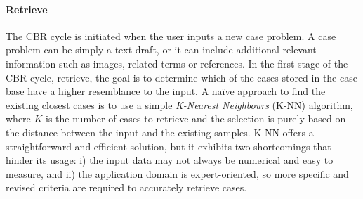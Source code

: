 \paragraph{Retrieve}\label{5_sec:dl_powered_cbr_retrieve}
The CBR cycle is initiated when the user inputs a new case problem. A case problem can be simply a text draft, or it can include additional relevant information such as images, related terms or references. In the first stage of the CBR cycle, retrieve, the goal is to determine which of the cases stored in the case base have a higher resemblance to the input. A naïve approach to find the existing closest cases is to use a simple \textit{K-Nearest Neighbours} (K-NN) algorithm, where $K$ is the number of cases to retrieve and the selection is purely based on the distance between the input and the existing samples. K-NN offers a straightforward and efficient solution, but it exhibits two shortcomings that hinder its usage: i) the input data may not always be numerical and easy to measure, and ii) the application domain is expert-oriented, so more specific and revised criteria are required to accurately retrieve cases.

